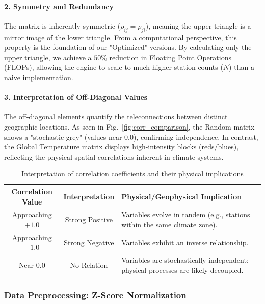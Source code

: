 \paragraph{2. Symmetry and Redundancy}
The matrix is inherently symmetric ($\rho_{ij} = \rho_{ji}$), meaning the upper triangle is a mirror image of the lower triangle. From a computational perspective, this property is the foundation of our "Optimized" versions. By calculating only the upper triangle, we achieve a $50\%$ reduction in Floating Point Operations (FLOPs), allowing the engine to scale to much higher station counts ($N$) than a naive implementation.

\paragraph{3. Interpretation of Off-Diagonal Values}
The off-diagonal elements quantify the teleconnections between distinct geographic locations. As seen in Fig.~\ref{fig:corr_comparison}, the Random matrix shows a "stochastic grey" (values near $0.0$), confirming independence. In contrast, the Global Temperature matrix displays high-intensity blocks (reds/blues), reflecting the physical spatial correlations inherent in climate systems.

\begin{table}[H]
\centering
\renewcommand{\arraystretch}{1.3}
\begin{tabular}{|c|c|p{6.5cm}|}
\hline
\textbf{Correlation Value} & \textbf{Interpretation} & \textbf{Physical/Geophysical Implication} \\
\hline
Approaching $+1.0$ & \centering Strong Positive & Variables evolve in tandem (e.g., stations within the same climate zone). \\
\hline
Approaching $-1.0$ & \centering Strong Negative & Variables exhibit an inverse relationship. \\
\hline
Near $0.0$ & \centering No Relation & Variables are stochastically independent; physical processes are likely decoupled. \\
\hline
\end{tabular}
\caption{Interpretation of correlation coefficients and their physical implications}
\label{tab:correlation_interpretation}
\end{table}

\subsubsection{Data Preprocessing: Z-Score Normalization}

